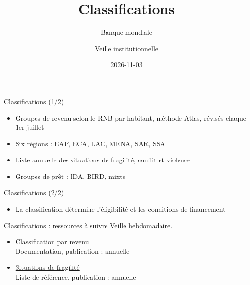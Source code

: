\documentclass[aspectratio=169,11pt]{beamer}
\title{Classifications}
\subtitle{Banque mondiale}
\author{Veille institutionnelle}
\date{2026-11-03}
\begin{document}
\begin{frame}\titlepage\end{frame}

\begin{frame}{Classifications (1/2)}
\begin{itemize}
\item Groupes de revenu selon le RNB par habitant, méthode Atlas, révisés chaque 1er juillet
\item Six régions : EAP, ECA, LAC, MENA, SAR, SSA
\item Liste annuelle des situations de fragilité, conflit et violence
\item Groupes de prêt : IDA, BIRD, mixte
\end{itemize}
\end{frame}

\begin{frame}{Classifications (2/2)}
\begin{itemize}
\item La classification détermine l'éligibilité et les conditions de financement
\end{itemize}
\end{frame}

\begin{frame}{Classifications : ressources à suivre}
\small
Veille hebdomadaire.
\begin{itemize}
\item \href{https://datahelpdesk.worldbank.org/knowledgebase/articles/906519-world-bank-country-and-lending-groups}{Classification par revenu}\\{\footnotesize Documentation, publication : annuelle}
\item \href{https://www.worldbank.org/en/topic/fragilityconflictviolence/brief/harmonized-list-of-fragile-situations}{Situations de fragilité}\\{\footnotesize Liste de référence, publication : annuelle}
\end{itemize}
\end{frame}
\end{document}
